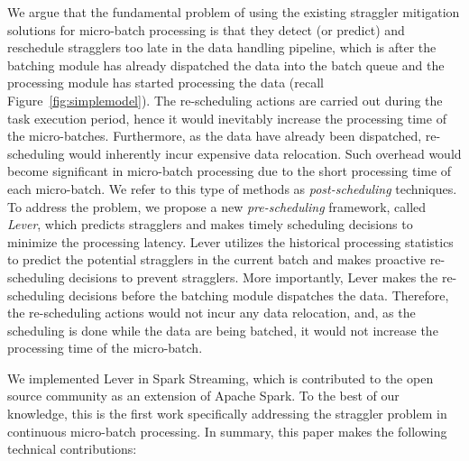 We argue that the fundamental problem of using the existing straggler mitigation
solutions for micro-batch processing is that they detect (or predict)
and reschedule stragglers too late in the data handling pipeline, which is after
the batching module has already dispatched the data into the batch queue and the
processing module has started processing the data (recall
Figure~\ref{fig:simplemodel}). The re-scheduling actions are carried out during
the task execution period, hence it would inevitably increase the processing
time of the micro-batches. Furthermore, as the data have already been
dispatched, re-scheduling would inherently incur expensive data relocation. Such
overhead would become significant in micro-batch processing due to the short
processing time of each micro-batch. We refer to this type of methods as
\emph{post-scheduling} techniques. To address the problem, we propose a new
\emph{pre-scheduling} framework, called \emph{Lever}, which predicts stragglers
and makes timely scheduling decisions to minimize the processing latency. Lever
utilizes the historical processing statistics to predict the potential
stragglers in the current batch and makes proactive re-scheduling decisions to
prevent stragglers. More importantly, Lever makes the re-scheduling decisions
before the batching module dispatches the data.  Therefore, the re-scheduling
actions would not incur any data relocation, and, as the scheduling is done
while the data are being batched, it would not increase the processing time of
the micro-batch. 

We implemented Lever in Spark Streaming, which is contributed to the open source
community as an extension of Apache Spark. To the best of our knowledge, this is
the first work specifically addressing the straggler problem in continuous
micro-batch processing. In summary, this paper makes the following technical
contributions:

